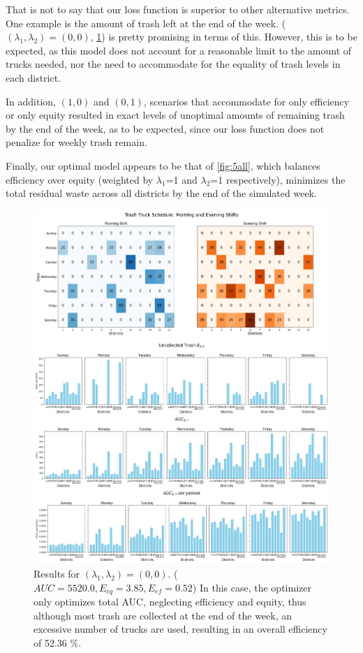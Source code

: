 \documentclass{article}
\begin{document}
That is not to say that our loss function is superior to other alternative metrics. One example is the amount of trash left at the end of the week. ($(\lambda_1, \lambda_2) = (0,0)$, \cref{fig:1all}) is pretty promising in terms of this. However, this is to be expected, as this model does not account for a reasonable limit to the amount of trucks needed, nor the need to accommodate for the equality of trash levels in each district.

In addition, $(1,0)$ and $(0,1)$, scenarios that accommodate for only efficiency or only equity resulted in exact levels of unoptimal amounts of remaining trash by the end of the week, as to be expected, since our loss function does not penalize for weekly trash remain.

Finally, our optimal model appears to be that of \cref{fig:5all}, which balances efficiency over equity (weighted by $\lambda_1$=1 and $\lambda_2$=1 respectively), minimizes the total residual waste across all districts by the end of the simulated week.

\begin{figure}[H]
	\centering
	\includegraphics[width=1\textwidth]{figures/(0,0).jpg}
	\caption{Results for $(\lambda_1, \lambda_2) = (0,0)$. ($AUC = 5520.0, E_{eq} = 3.85, E_{ef} = 0.52$) In this case, the optimizer only optimizes total AUC, neglecting efficiency and equity, thus although most trash are collected at the end of the week, an excessive number of trucks are used, resulting in an overall efficiency of 52.36 \%. }
	\label{fig:1all}
\end{figure}
\end{document}
